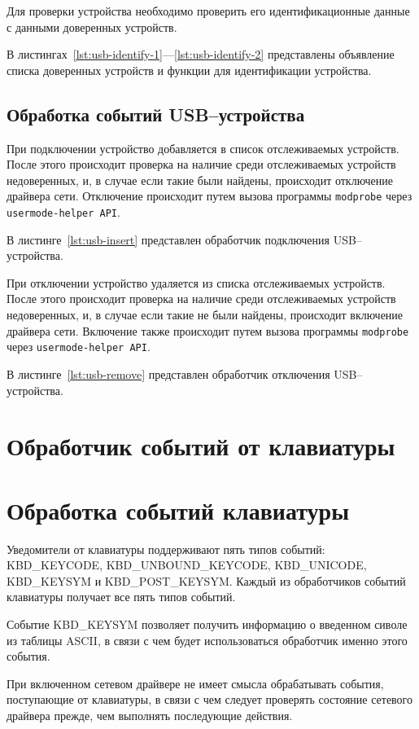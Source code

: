 Для проверки устройства необходимо проверить его идентификационные данные с данными доверенных устройств. 

В листингах~\ref{lst:usb-identify-1}---\ref{lst:usb-identify-2} представлены объявление списка доверенных устройств и функции для идентификации устройства.

\subsection{Обработка событий USB--устройства}
\label{sect:usb-not}

При подключении устройство добавляется в список отслеживаемых устройств. После этого происходит проверка на наличие среди отслеживаемых устройств недоверенных, и, в случае если такие были найдены, происходит отключение драйвера сети. Отключение происходит путем вызова программы \texttt{modprobe} через \texttt{usermode-helper API}.

В листинге~\ref{lst:usb-insert} представлен обработчик подключения USB--устройства.

При отключении устройство удаляется из списка отслеживаемых устройств. После этого происходит проверка на наличие среди отслеживаемых устройств недоверенных, и, в случае если такие не были найдены, происходит включение драйвера сети. Включение также происходит путем вызова программы \texttt{modprobe} через \texttt{usermode-helper API}.

В листинге~\ref{lst:usb-remove} представлен обработчик отключения USB--устройства.

\section{Обработчик событий от клавиатуры}

\section{Обработка событий клавиатуры}
\label{sect:kbd-not}

Уведомители от клавиатуры поддерживают пять типов событий: KBD\_KEYCODE, KBD\_UNBOUND\_KEYCODE, KBD\_UNICODE, KBD\_KEYSYM и KBD\_POST\_KEYSYM. Каждый из обработчиков событий клавиатуры получает все пять типов событий. 

Событие KBD\_KEYSYM позволяет получить информацию о введенном сиволе из таблицы ASCII, в связи с чем будет использоваться обработчик именно этого события.

При включенном сетевом драйвере не имеет смысла обрабатывать события, поступающие от клавиатуры, в связи с чем следует проверять состояние сетевого драйвера прежде, чем выполнять последующие действия.

